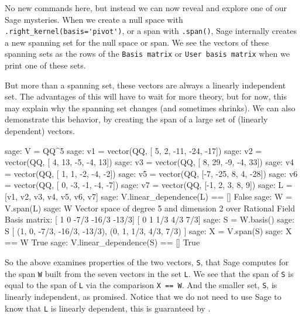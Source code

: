 No new commands here, but instead we can now reveal and explore one of our Sage mysteries.  When we create a null space with \verb?.right_kernel(basis='pivot')?, or a span with \verb?.span()?, Sage internally creates a new spanning set for the null space or span.  We see the vectors of these spanning sets as the rows of the \verb?Basis matrix? or \verb?User basis matrix? when we print one of these sets.\par
%
But more than a spanning set, these vectors are always a linearly independent set.  The advantages of this will have to wait for more theory, but for now, this may explain why the spanning set changes (and sometimes shrinks).  We can also demonstrate this behavior, by creating the span of a large set of (linearly dependent) vectors.
%
\begin{sageexample}
sage: V = QQ^5
sage: v1 = vector(QQ, [ 5,   2, -11, -24, -17])
sage: v2 = vector(QQ, [ 4,  13,  -5,  -4,  13])
sage: v3 = vector(QQ, [ 8,  29,  -9,  -4,  33])
sage: v4 = vector(QQ, [ 1,   1,  -2,  -4,  -2])
sage: v5 = vector(QQ, [-7, -25,   8,   4, -28])
sage: v6 = vector(QQ, [ 0,  -3,  -1,  -4,  -7])
sage: v7 = vector(QQ, [-1,   2,   3,   8,   9])
sage: L = [v1, v2, v3, v4, v5, v6, v7]
sage: V.linear_dependence(L) == []
False
sage: W = V.span(L)
sage: W
Vector space of degree 5 and dimension 2 over Rational Field
Basis matrix:
[    1     0  -7/3 -16/3 -13/3]
[    0     1   1/3   4/3   7/3]
sage: S = W.basis()
sage: S
[
(1, 0, -7/3, -16/3, -13/3),
(0, 1, 1/3, 4/3, 7/3)
]
sage: X = V.span(S)
sage: X == W
True
sage: V.linear_dependence(S) == []
True
\end{sageexample}
%
So the above examines properties of the two vectors, \verb?S?, that Sage computes for the span \verb?W? built from the seven vectors in the set \verb?L?.  We see that the span of \verb?S? is equal to the span of \verb?L? via the comparison \verb?X == W?.  And the smaller set, \verb?S?, is linearly independent, as promised.  Notice that we do not need to use Sage to know that \verb?L? is linearly dependent, this is guaranteed by .
%
\begin{sageverbatim}
\end{sageverbatim}
%